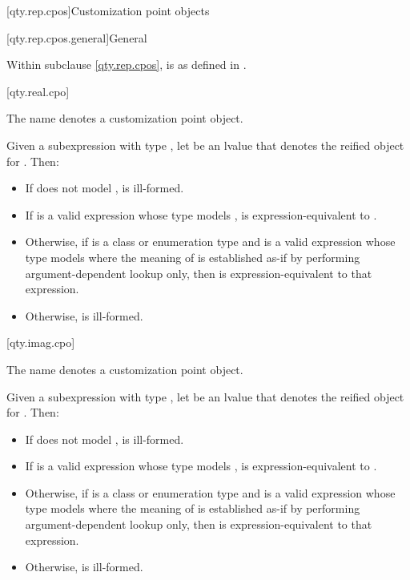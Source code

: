 [qty.rep.cpos]{Customization point objects}

[qty.rep.cpos.general]{General}

\pnum
Within subclause \ref{qty.rep.cpos},
 is as defined in .

[qty.real.cpo]{}

\pnum
The name  denotes a customization point object.

\pnum
Given a subexpression  with type ,
let  be an lvalue that denotes the reified object for .
Then:
\begin{itemize}
\item
If  does not model ,
 is ill-formed.
\item
If  is a valid expression whose type models ,
 is expression-equivalent to .
\item
Otherwise, if  is a class or enumeration type and
 is a valid expression whose type models 
where the meaning of  is established as-if by performing argument-dependent lookup only,
then  is expression-equivalent to that expression.
\item
Otherwise,  is ill-formed.
\end{itemize}

[qty.imag.cpo]{}

\pnum
The name  denotes a customization point object.

\pnum
Given a subexpression  with type ,
let  be an lvalue that denotes the reified object for .
Then:
\begin{itemize}
\item
If  does not model ,
 is ill-formed.
\item
If  is a valid expression whose type models ,
 is expression-equivalent to .
\item
Otherwise, if  is a class or enumeration type and
 is a valid expression whose type models 
where the meaning of  is established as-if by performing argument-dependent lookup only,
then  is expression-equivalent to that expression.
\item
Otherwise,  is ill-formed.
\end{itemize}

